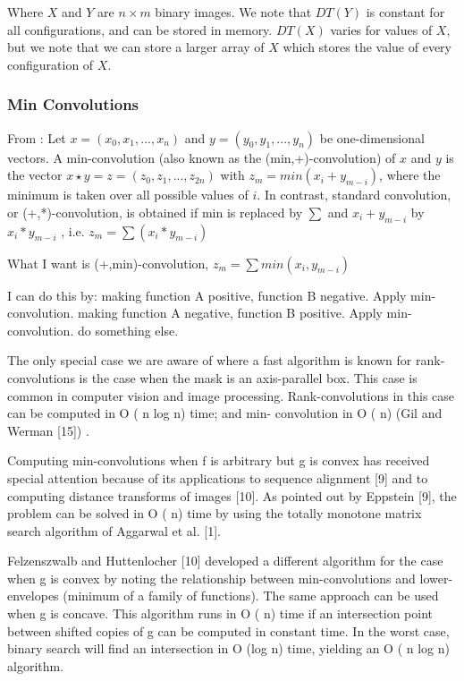 Where $X$ and $Y$ are $n \times m$ binary images.
We note that $DT(Y)$ is constant for all configurations, and can be stored in
memory. $DT(X)$ varies for values of $X$, but we note that we can store a larger
array of $X$ which stores the value of every configuration of $X$.

\subsubsection{Min Convolutions}
From \cite{burcsi2010table}:
Let $x = (x_0, x_1, ..., x_n)$ and $y = (y_0, y_1, ..., y_n)$ be one-dimensional
vectors.
A min-convolution (also known as the (min,+)-convolution) of $x$ and $y$ is the
vector $x \star y = z = (z_0, z_1, ...,z_{2n})$
with $z_m = min(x_i + y_{m-i})$, where the minimum is taken over all possible
values of $i$. 
In contrast, standard convolution, or (+,*)-convolution, is obtained if min is replaced by $\sum$ and
$x_i + y_{m-i}$ by $x_i * y_{m-i}$ , i.e. 
$z_m = \sum(x_i * y_{m-i})$

What I want is (+,min)-convolution, $z_m = \sum min(x_i , y_{m-i})$

I can do this by:
making function A positive, function B negative.
Apply min-convolution.
making function A negative, function B positive.
Apply min-convolution.
do something else.


The only special case we are aware of where a fast algorithm is known for
rank-convolutions is the case when the mask is an axis-parallel box. This case
is common in computer vision and image processing. Rank-convolutions in this
case can be computed in O ( n log n) time; and min- convolution in O ( n) (Gil
and Werman [15]) \cite{babai2009computing}.

Computing min-convolutions when f is arbitrary but g is convex has received
special attention because of its applications to sequence alignment [9] and to
computing distance transforms of images [10]. As pointed out by Eppstein [9],
the problem can be solved in O ( n) time by using the totally monotone matrix
search algorithm of Aggarwal et al. [1].
\cite{babai2009computing}

Felzenszwalb and Huttenlocher [10] developed a different algorithm for the case
when g is convex by noting the relationship between min-convolutions and
lower-envelopes (minimum of a family of functions). The same approach can be
used when g is concave. This algorithm runs in O ( n) time if an intersection
point between shifted copies of g can be computed in constant time. In the worst
case, binary search will find an intersection in O (log n) time, yielding an O (
n log n) algorithm.
\cite{babai2009computing}


